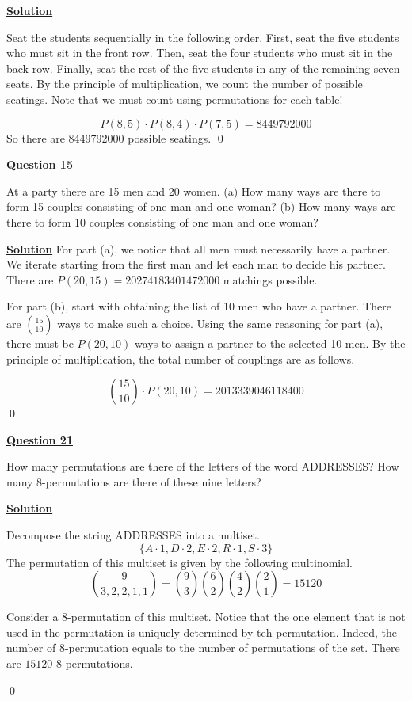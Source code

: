\documentclass{article}
\newcommand{\new}[1]{
    \vspace{2mm}
    \noindent
    \textbf{
    \underline{#1}}
}
\newcommand{\m}{
    \cdot
}
\begin{document}
\new{Solution} 
Seat the students sequentially in the following order. First, seat 
the five students who must sit in the front row. Then, seat the 
four students who must sit in the back row. Finally, seat the rest 
of the five students in any of the remaining seven seats. By the 
principle of multiplication, we count the number of possible seatings. 
\color{red}
Note that we must count using permutations for each table!
\color{black}

\color{red}
\[
    P(8, 5) \m P(8, 4) \m P(7, 5) = \boxed{8449792000}
\]
\color{black}
So there are 8449792000 possible seatings. 
\hfill \qed

\new{Question 15}
At a party there are 15 men and 20 women. 
(a) How many ways are there to form 15 couples consisting of one man and 
one woman? 
(b) How many ways are there to form 10 couples consisting of one man and 
one woman? 

\new{Solution} For part (a), we notice that all men must necessarily 
have a partner. We iterate starting from the first man and let 
each man to decide his partner. There are $\boxed{P(20, 15) = 20274183401472000}$ matchings possible. 

For part (b), start with obtaining the list of 10 men who have a partner. 
There are $\binom{15}{10}$ ways to make such a choice. Using the same reasoning 
for part (a), there must be $P(20, 10)$ ways to assign a partner to the 
selected 10 men. By the principle of multiplication, the total number 
of couplings are as follows.

\[
    \boxed{\binom{15}{10} \m P(20, 10) = 2013339046118400}
\]
\hfill \qed

\new{Question 21}
How many permutations are there of the letters of the word ADDRESSES? How 
many 8-permutations are there of these nine letters?

\new{Solution}
Decompose the string ADDRESSES into a multiset. 
\[
    \{A\m 1, D\m 2, E\m 2, R\m 1, S \m 3\}
\]
The permutation of this multiset is given by the following multinomial. 
\[
    \boxed{\binom{9}{3, 2, 2, 1, 1} = 
    \binom{9}{3} \binom{6}{2} \binom{4}{2} \binom{2}{1}=
    15120}
\]

Consider a 8-permutation of this multiset. Notice that the one 
element that is not used in the permutation is uniquely determined 
by teh permutation. Indeed, the number of 8-permutation equals 
to the number of permutations of the set. There are $\boxed{15120}$ 8-permutations. 

\hfill \qed
\end{document}
